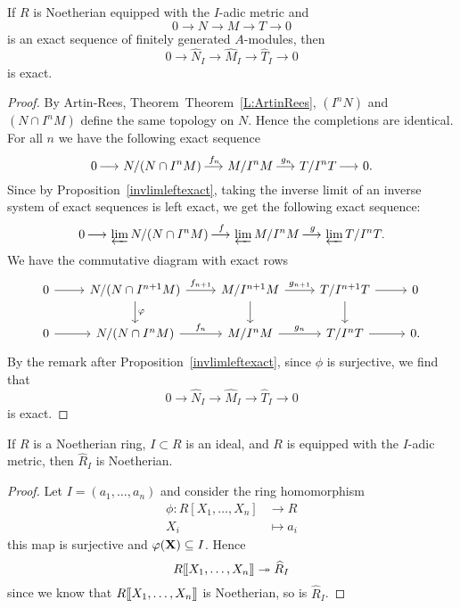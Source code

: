 \documentclass{ximera}
\begin{document}
\begin{proposition}\label{P:compexact}
  If $R$ is Noetherian equipped with the $I$-adic metric and
  \[
  0\to N \to M \to T \to 0
  \]
  is an exact sequence of finitely generated $A$-modules, then 
  \[
  0\to \hat{N}_I \to \hat{M}_I \to \hat{T}_I \to 0
  \]
  is exact.
  \begin{proof}
    By Artin-Rees,
    Theorem~Theorem~\ref{L:ArtinRees}, $(I^n N)$ and
    $(N \cap I^n M)$ define the same topology on $N$.  Hence the
    completions are identical.  For all $n$ we have the following
    exact sequence
    \[
    0 \mathop{\longrightarrow\,}\limits N / (N \cap I^n M) \mathop{\longrightarrow\,}\limits^{f_n} M / I^n M \mathop{\longrightarrow\,}\limits^{g_n} T / I^n T \mathop{\longrightarrow\,}\limits
    0.
    \]
    Since by Proposition~\ref{invlimleftexact}, taking the inverse
    limit of an inverse system of exact sequences is left exact, we
    get the following exact sequence:
    \[
    0 \mathop{\longrightarrow\,}\limits \varprojlim N/(N \cap I^nM) \mathop{\longrightarrow\,}\limits^{f} \varprojlim M/I^nM \mathop{\longrightarrow\,}\limits^{g} \varprojlim T/I^nT.
    \]
    We have the commutative diagram with exact rows
    \[
    \begin{tikzcd}
      0 \ar[r] & N/(N \cap I^{n+1}M) \ar[d,"\phi"] \ar[r,"f_{n+1}"] & M/I^{n+1}M \ar[d] \ar[r,"g_{n+1}"] & T/I^{n+1}T \ar[r] \ar[d] & 0 \\
      0 \ar[r] & N/(N \cap I^nM) \ar[r,"f_n"] & M/I^nM \ar[r,"g_n"] & T/I^nT \ar[r] & 0. 
    \end{tikzcd}
    \]
    By the remark after Proposition~\ref{invlimleftexact}, since
    $\phi$ is surjective, we find that
    \[
    0\to \hat{N}_I \to \hat{M}_I \to \hat{T}_I \to 0
    \]
    is exact.
\end{proof}
\end{proposition}


\begin{corollary}
  If $R$ is a Noetherian ring, $I\subset R$ is an ideal, and $R$ is
  equipped with the $I$-adic metric, then $\hat{R}_I$ is Noetherian.
  \begin{proof}
    Let $I = (a_1,\dots,a_n)$ and consider the ring homomorphism
    \begin{align*}
      \phi:R[X_1,\dots, X_n] &\to R \\
      X_i &\mapsto a_i
    \end{align*}
    this map is surjective and $\varphi(\mathbf X) \subseteq I$. Hence
    \[
    R[\hspace{-0.25ex}[ X_1,\dots, X_n]\hspace{-0.25ex}] \twoheadrightarrow \widehat{R}_I
    \]
    since we know that $R[\hspace{-0.25ex}[ X_1,\dots, X_n]\hspace{-0.25ex}]$ is Noetherian, so is
    $\hat{R}_I$.
  \end{proof}
\end{corollary}
\end{document}
